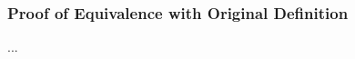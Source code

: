 \documentclass[conference]{IEEEtran}
\begin{document}










\subsubsection{Proof of Equivalence with Original Definition } ...
\end{document}
